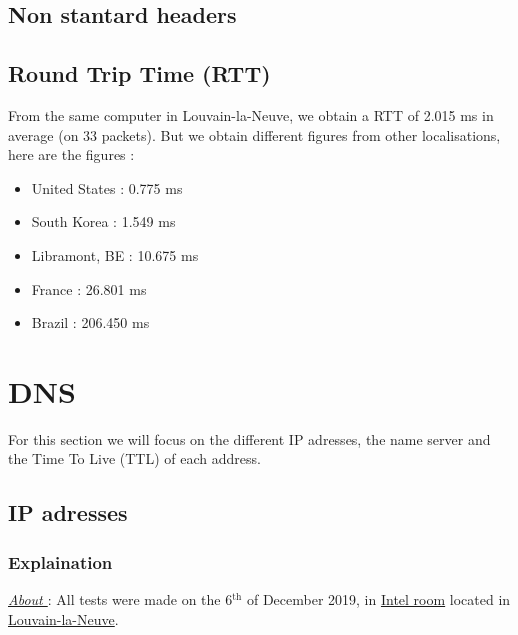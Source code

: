 \documentclass{article}
\begin{document}
\subsection{Non stantard headers}
\label{sub:nonstandard}

\subsection{Round Trip Time (RTT)}
\label{sub:rtt}

From the same computer in Louvain-la-Neuve, we obtain a RTT of 2.015 ms in average (on 33 packets). But we obtain different figures from other localisations, here are the figures : 
\begin{itemize}
    \itemsep-0.1em 
    \item United States :  0.775 ms
    \item South Korea : 1.549 ms
    \item Libramont, BE : 10.675 ms
    \item France : 26.801 ms
    \item Brazil : 206.450 ms
\end{itemize}

\section{DNS}
\label{sec:DNS}


For this section we will focus on the different IP adresses, the name server and the Time To Live (TTL) of each address.

\subsection{IP adresses}

\subsubsection{Explaination}
\label{subsub:ipexp}

\textit{\underline{About }}: All tests were made on the 6$^{\text{th}}$ of December 2019, in \href{https://goo.gl/maps/o6d29MMUkajAf4NXA}{Intel room} located in \href{https://goo.gl/maps/o6d29MMUkajAf4NXA}{Louvain-la-Neuve}.
\end{document}
